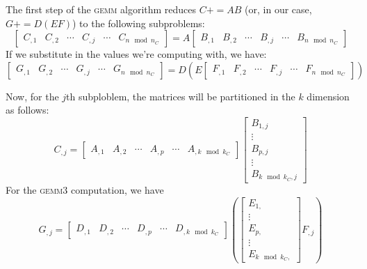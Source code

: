 \documentclass[12pt]{article}
\newcommand*{\pluseq}{\mathrel{{+}{=}}}
\newcommand*{\gemmt}{{\textsc{gemm3}}}
\newcommand*{\gemm}{{\textsc{gemm}}}
\begin{document}
The first step of the \gemm{} algorithm reduces $C \pluseq AB$ (or, in our case, $G \pluseq D(EF)$) to the following subproblems:
\begin{equation*}
  \left[\begin{array}{c|c|c|c|c|c}
    C_{,1}&C_{,2}&\cdots&C_{,j}&\cdots& C_{n \mod n_C}
  \end{array}\right]
  = A
  \left[\begin{array}{c|c|c|c|c|c}
    B_{,1}&B_{,2}&\cdots&B_{,j}&\cdots&B_{n \mod n_C}
  \end{array}\right]
\end{equation*}
If we substitute in the values we're computing with, we have:
\begin{equation*}
  \left[\begin{array}{c|c|c|c|c|c}
    G_{,1}&G_{,2}&\cdots&G_{,j}&\cdots& G_{n \mod n_C}
  \end{array}\right]
  = D\left(
    E
    \left[\begin{array}{c|c|c|c|c|c}
      F_{,1}&F_{,2}&\cdots&F_{,j}&\cdots&F_{n \mod n_C}
    \end{array}\right]
  \right)
\end{equation*}

Now, for the $j$th subploblem, the matrices will be partitioned in the $k$ dimension as follows:
\begin{equation*}
  C_{,j}
  =
  \left[\begin{array}{c|c|c|c|c|c}
    A_{,1}&A_{,2}&\cdots&A_{,p}&\cdots&A_{,k \mod k_C}
  \end{array}\right]
  \left[\begin{array}{c}
    B_{1,j}\\\hline
    \vdots\\\hline
    B_{p,j}\\\hline
    \vdots\\\hline
    B_{k \mod k_C,j}
  \end{array}\right]
\end{equation*}
For the \gemmt{} computation, we have
\begin{equation*}
  G_{,j}
  =
  \left[\begin{array}{c|c|c|c|c|c}
    D_{,1}&D_{,2}&\cdots&D_{,p}&\cdots&D_{,k \mod k_C}
  \end{array}\right]
  \left(
  \left[\begin{array}{c}
          E_{1,}\\\hline
          \vdots\\\hline
          E_{p,}\\\hline
          \vdots\\\hline
          E_{k \mod k_C,}
  \end{array}\right]
  F_{,j}
  \right)
\end{equation*}
\end{document}
